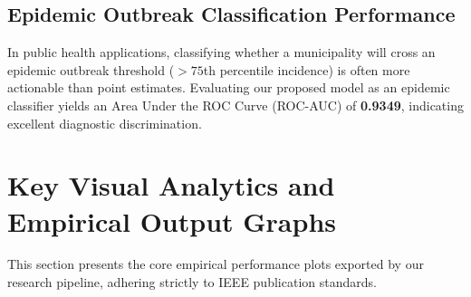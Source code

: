 \documentclass[journal,onecolumn,11pt]{IEEEtran}
\begin{document}
\begin{table}[t!]
\centering
\caption{Empirical Multi-Level Validation Performance of Stage 2 Dengue Forecasting Engine (2023--2024 Unseen Holdout Set)}
\label{tab:empirical_metrics}
\end{table}

\subsection{Epidemic Outbreak Classification Performance}
In public health applications, classifying whether a municipality will cross an epidemic outbreak threshold ($>75$th percentile incidence) is often more actionable than point estimates. Evaluating our proposed model as an epidemic classifier yields an Area Under the ROC Curve (ROC-AUC) of \textbf{0.9349}, indicating excellent diagnostic discrimination.

\section{Key Visual Analytics and Empirical Output Graphs}

This section presents the core empirical performance plots exported by our research pipeline, adhering strictly to IEEE publication standards.
\end{document}
